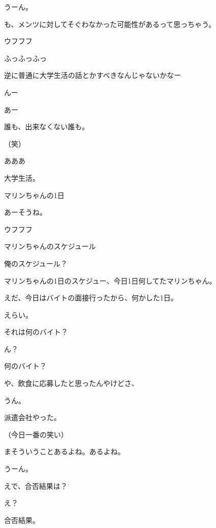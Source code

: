 \begin{multicols}{3}
{        うーん。

        も、メンツに対してそぐわなかった可能性があるって思っちゃう。

        ウフフフ

        ふっふっふっ

        逆に普通に大学生活の話とかすべきなんじゃないかなー

        んー

        あー

        誰も、出来なくない誰も。

        （笑）

        あああ

        大学生活。

        マリンちゃんの1日

        あーそうね。

        ウフフフ

        マリンちゃんのスケジュール

        俺のスケジュール？

        マリンちゃんの1日のスケジュー、今日1日何してたマリンちゃん。

        えだ、今日はバイトの面接行ったから、何かした1日。

        えらい。

        それは何のバイト？

        ん？

        何のバイト？

        や、飲食に応募したと思ったんやけどさ、

        うん。

        派遣会社やった。

        （今日一番の笑い）

        まそういうことあるよね。あるよね。

        うーん。

        えで、合否結果は？

        え？

        合否結果。

}
\end{multicols}
